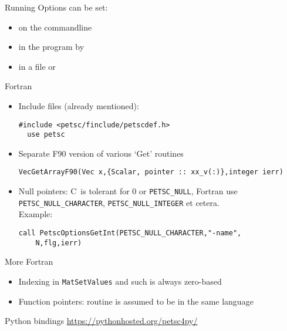\begin{numberedframe}{Running}
Options can be set:
\begin{itemize}
\item on the commandline
\item in the program by 
\item in a file  or 
\end{itemize}
\end{numberedframe}

\begin{numberedframe}{Fortran}

  \begin{itemize}
  \item Include files (already mentioned):
\begin{verbatim}
#include <petsc/finclude/petscdef.h>
  use petsc
\end{verbatim}
  \item Separate F90 version of various `Get' routines
\begin{verbatim}
VecGetArrayF90(Vec x,{Scalar, pointer :: xx_v(:)},integer ierr)
\end{verbatim}
\item Null pointers: C~is tolerant for 0 or \lstinline{PETSC_NULL}, Fortran
    use \lstinline{PETSC_NULL_CHARACTER}, \lstinline{PETSC_NULL_INTEGER} et cetera.\\
    Example:
\begin{verbatim}
call PetscOptionsGetInt(PETSC_NULL_CHARACTER,"-name",
    N,flg,ierr)
\end{verbatim}
  \end{itemize}
\end{numberedframe}

\begin{longversion}
\begin{numberedframe}{More Fortran}
  \begin{itemize}
  \item Indexing in \lstinline{MatSetValues} and such is always zero-based
  \item Function pointers: routine is assumed to be in the same language
  \end{itemize}
\end{numberedframe}

\end{longversion}

\begin{numberedframe}{Python bindings}
  \url{https://pythonhosted.org/petsc4py/}
\end{numberedframe}

